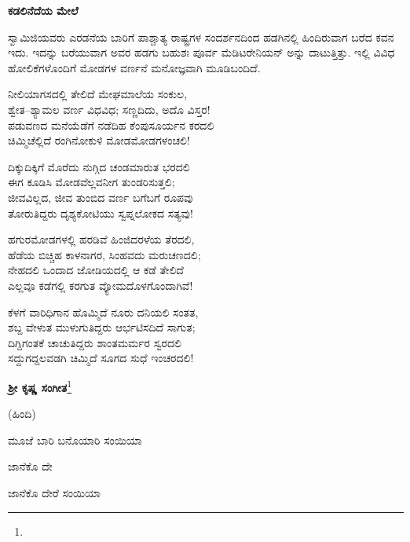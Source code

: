 \begin{center}
\textbf{ಕಡಲಿನೆದೆಯ ಮೇಲೆ}
\end{center}

ಸ್ವಾಮಿಜಿಯವರು ಎರಡನೆಯ ಬಾರಿಗೆ ಪಾಶ್ಚಾತ್ಯ ರಾಷ್ಟ್ರಗಳ ಸಂದರ್ಶನದಿಂದ ಹಡಗಿನಲ್ಲಿ ಹಿಂದಿರುವಾಗ ಬರೆದ ಕವನ ಇದು. ಇದನ್ನು ಬರೆಯುವಾಗ ಅವರ ಹಡಗು ಬಹುಶಃ ಪೂರ್ವ ಮೆಡಿಟರೇನಿಯನ್‌ ಅನ್ನು ದಾಟುತ್ತಿತ್ತು. ಇಲ್ಲಿ ವಿವಿಧ ಹೋಲಿಕೆಗಳೊಂದಿಗೆ ಮೋಡಗಳ ವರ್ಣನೆ ಮನೋಜ್ಞವಾಗಿ ಮೂಡಿಬಂದಿದೆ.

ನೀಲಿಯಾಗಸದಲ್ಲಿ ತೇಲಿದೆ ಮೇಘಮಾಲೆಯ ಸಂಕುಲ,\\ಶ್ವೇತ–ಶ್ಯಾಮಲ ವರ್ಣ ವಿಧವಿಧ; ಸಣ್ಣದಿದು, ಅದೊ ವಿಸ್ತರ!\\ಪಡುವಣದ ಮನೆಯೆಡೆಗೆ ನಡೆದಿಹ ಕೆಂಪುಸೂರ್ಯನ ಕರದಲಿ\\ಚಿಮ್ಮಿಚೆಲ್ಲಿದೆ ರಂಗಿನೋಕುಳಿ ಮೋಡಮೋಡಗಳಂಚಲಿ!

ದಿಕ್ಕುದಿಕ್ಕಿಗೆ ಮೊರೆದು ನುಗ್ಗಿದ ಚಂಡಮಾರುತ ಭರದಲಿ\\ಈಗ ಕೂಡಿಸಿ ಮೋಡವೆಲ್ಲವನೀಗ ತುಂಡರಿಸುತ್ತಲಿ;\\ಜೀವವಿಲ್ಲದ, ಜೀವ ತುಂಬಿದ ವರ್ಣ ಬಗೆಬಗೆ ರೂಪವು\\ತೋರುತಿದ್ದರು ದೃಶ್ಯಕೋಟಿಯು ಸ್ವಪ್ನಲೋಕದ ಸತ್ಯವು!

ಹಗುರಮೋಡಗಳಲ್ಲಿ ಹರಡಿವೆ ಹಿಂಜಿದರಳೆಯ ತೆರದಲಿ,\\ಹೆಡೆಯ ಬಿಚ್ಚಿಹ ಕಾಳನಾಗರ, ಸಿಂಹವದು ಮರುಚಣದಲಿ;\\ನೇಹದಲಿ ಒಂದಾದ ಜೋಡಿಯದಲ್ಲಿ ಆ ಕಡೆ ತೇಲಿದೆ\\ಎಲ್ಲವೂ ಕಡೆಗಲ್ಲಿ ಕರಗುತ ವ್ಯೋಮದೊಳಗೊಂದಾಗಿವೆ!

ಕೆಳಗೆ ವಾರಿಧಿಗಾನ ಹೊಮ್ಮಿದೆ ನೂರು ದನಿಯಲಿ ಸಂತತ,\\ಶಬ್ದ ವೇಳುತ ಮುಳುಗುತಿದ್ದರು ಆರ್ಭಟಿಸದಿದೆ ಸಾಗುತ;\\ದಿಗ್ದಿಗಂತಕೆ ಚಾಚುತಿದ್ದರು ಶಾಂತಮರ್ಮರ ಸ್ವರದಲಿ\\ಸದ್ದುಗದ್ದಲವಡಗಿ ಚಿಮ್ಮಿದೆ ಸೂಗದ ಸುಧೆ ಇಂಚರದಲಿ!

\begin{center}
\textbf{ಶ‍್ರೀ ಕೃಷ್ಣ ಸಂಗೀತ}\footnote{}
\end{center}

\begin{center}
(ಹಿಂದಿ)
\end{center}

\begin{myquote}
ಮೂಜೆ ಬಾರಿ ಬನೊಯಾರಿ ಸಂಯಿಯಾ
\end{myquote}

\begin{flushright}
ಜಾನೆಕೊ ದೇ
\end{flushright}

\begin{myquote}
ಜಾನೆಕೊ ದೇರೆ ಸಂಯಿಯಾ
\end{myquote}

